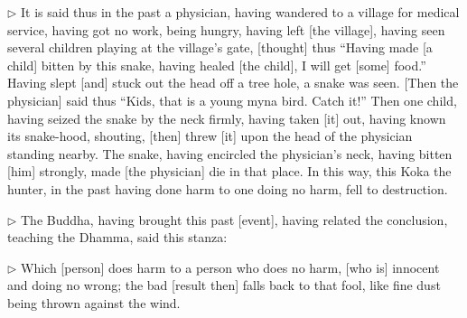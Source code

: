 \addtocounter{sennum}{-3}
$\triangleright$  It is said thus in the past a physician, having wandered to a village for medical service, having got no work, being hungry, having left [the village], having seen several children playing at the village's gate, [thought] thus ``Having made [a child] bitten by this snake, having healed [the child], I will get [some] food.'' Having slept [and] stuck out the head off a tree hole, a snake was seen. [Then the physician] said thus ``Kids, that is a young myna bird. Catch it!''  Then one child, having seized the snake by the neck firmly, having taken [it] out, having known its snake-hood, shouting, [then] threw [it] upon the head of the physician standing nearby.  The snake, having encircled the physician's neck, having bitten [him] strongly, made [the physician] die in that place. In this way, this Koka the hunter, in the past having done harm to one doing no harm, fell to destruction.\\


\addtocounter{sennum}{-1}
$\triangleright$  The Buddha, having brought this past [event], having related the conclusion, teaching the Dhamma, said this stanza:\\


\addtocounter{sennum}{-2}
$\triangleright$  Which [person] does harm to a person who does no harm, [who is] innocent and doing no wrong;  the bad [result then] falls back to that fool, like fine dust being thrown against the wind.\\

